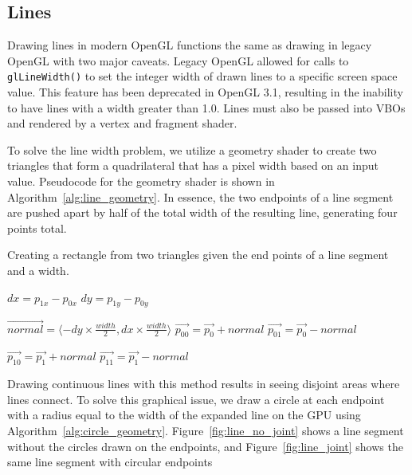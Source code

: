 \subsection{Lines}
\label{subsection:lines}

Drawing lines in modern OpenGL functions the same as drawing in legacy OpenGL with two major caveats. 
Legacy OpenGL allowed for calls to {\tt glLineWidth()} to set the integer width of drawn lines to a specific 
screen space value. This feature has been deprecated in OpenGL 3.1, resulting in the inability to 
have lines with a width greater than 1.0. Lines must also be passed into VBOs and rendered by a vertex and fragment shader.

To solve the line width problem, we utilize a geometry shader to create two triangles that form a quadrilateral 
that has a pixel width based on an input value. Pseudocode for the geometry shader is shown 
in Algorithm~\ref{alg:line_geometry}. In essence, the two endpoints of a line segment are pushed apart by half 
of the total width of the resulting line, generating four points total.

\begin{algorithm}
    \caption{Creating a rectangle from two triangles given the end points of a line segment and a width.}
    \label{alg:line_geometry}
    \begin{algorithmic}[1]
        \State $dx = p_{1x} - p_{0x}$
        \State $dy = p_{1y} - p_{0y}$

        \State $\vec{normal} = \langle -dy \times \frac{width}{2}, dx \times \frac{width}{2}\rangle$
        \State $\vec{p_{00}} = \vec{p_0} + normal$
        \State $\vec{p_{01}} = \vec{p_0} - normal$

        \State $\vec{p_{10}} = \vec{p_1} + normal$
        \State $\vec{p_{11}} = \vec{p_1} - normal$

        \State {}
        \State {}
        \State {}
        \State {}

        \EndFunction
    \end{algorithmic}
\end{algorithm}

Drawing continuous lines with this method results in seeing disjoint areas where lines connect. 
To solve this graphical issue, we draw a circle at each endpoint with a radius equal to the width of the expanded line on the GPU using Algorithm~\ref{alg:circle_geometry}. Figure~\ref{fig:line_no_joint} shows a line segment without the circles drawn on the endpoints, and Figure~\ref{fig:line_joint} shows the same line segment with circular endpoints 

